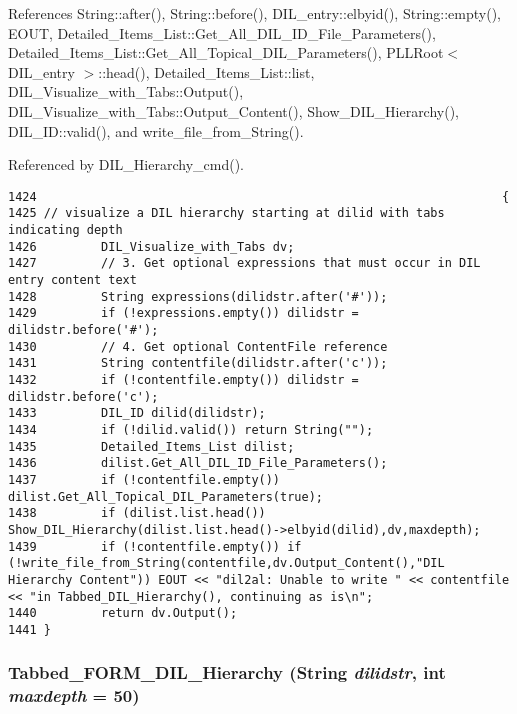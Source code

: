 References String::after(), String::before(), DIL\_\-entry::elbyid(), String::empty(), EOUT, Detailed\_\-Items\_\-List::Get\_\-All\_\-DIL\_\-ID\_\-File\_\-Parameters(), Detailed\_\-Items\_\-List::Get\_\-All\_\-Topical\_\-DIL\_\-Parameters(), PLLRoot$<$ DIL\_\-entry $>$::head(), Detailed\_\-Items\_\-List::list, DIL\_\-Visualize\_\-with\_\-Tabs::Output(), DIL\_\-Visualize\_\-with\_\-Tabs::Output\_\-Content(), Show\_\-DIL\_\-Hierarchy(), DIL\_\-ID::valid(), and write\_\-file\_\-from\_\-String().

Referenced by DIL\_\-Hierarchy\_\-cmd().



\footnotesize\begin{verbatim}1424                                                                 {
1425 // visualize a DIL hierarchy starting at dilid with tabs indicating depth
1426         DIL_Visualize_with_Tabs dv;
1427         // 3. Get optional expressions that must occur in DIL entry content text
1428         String expressions(dilidstr.after('#'));
1429         if (!expressions.empty()) dilidstr = dilidstr.before('#');
1430         // 4. Get optional ContentFile reference
1431         String contentfile(dilidstr.after('c'));
1432         if (!contentfile.empty()) dilidstr = dilidstr.before('c');
1433         DIL_ID dilid(dilidstr);
1434         if (!dilid.valid()) return String("");
1435         Detailed_Items_List dilist;
1436         dilist.Get_All_DIL_ID_File_Parameters();
1437         if (!contentfile.empty()) dilist.Get_All_Topical_DIL_Parameters(true);
1438         if (dilist.list.head()) Show_DIL_Hierarchy(dilist.list.head()->elbyid(dilid),dv,maxdepth);
1439         if (!contentfile.empty()) if (!write_file_from_String(contentfile,dv.Output_Content(),"DIL Hierarchy Content")) EOUT << "dil2al: Unable to write " << contentfile << "in Tabbed_DIL_Hierarchy(), continuing as is\n";
1440         return dv.Output();
1441 }
\end{verbatim}\normalsize 
{}
\subsubsection{ Tabbed\_\-FORM\_\-DIL\_\-Hierarchy ({\bf String} {\em dilidstr}, int {\em maxdepth} = 50)}\label{dil2al_8hh_a314}




